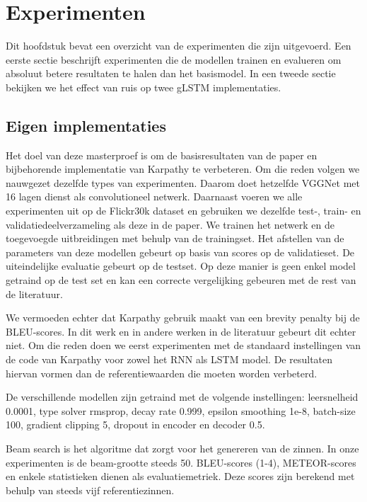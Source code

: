 \chapter{Experimenten} %
\label{cha:experimenten}
Dit hoofdstuk bevat een overzicht van de experimenten die zijn uitgevoerd. Een eerste sectie beschrijft experimenten die de modellen trainen en evalueren om absoluut betere resultaten te halen dan het basismodel. In een tweede sectie bekijken we het effect van ruis op twee gLSTM implementaties.

\section{Eigen implementaties} %
\label{sec:eigen_implementaties_exp}
Het doel van deze masterproef is om de basisresultaten van de paper en bijbehorende implementatie van Karpathy\cite{Karpathy2015} te verbeteren. Om die reden volgen we nauwgezet dezelfde types van experimenten. Daarom doet hetzelfde VGGNet met 16 lagen dienst als convolutioneel netwerk. Daarnaast voeren we alle experimenten uit op de Flickr30k dataset en gebruiken we dezelfde test-, train- en validatiedeelverzameling als deze in de paper. We trainen het netwerk en de toegevoegde uitbreidingen met behulp van de trainingset. Het afstellen van de parameters van deze modellen gebeurt op basis van scores op de validatieset. De uiteindelijke evaluatie gebeurt op de testset. Op deze manier is geen enkel model getraind op de test set en kan een correcte vergelijking gebeuren met de rest van de literatuur.

We vermoeden echter dat Karpathy gebruik maakt van een brevity penalty  bij de BLEU-scores. In dit werk en in andere werken in de literatuur gebeurt dit echter niet. Om die reden doen we eerst experimenten met de standaard instellingen van de code van Karpathy voor zowel het RNN als LSTM model. De resultaten hiervan vormen dan de referentiewaarden die moeten worden verbeterd. 

De verschillende modellen zijn getraind met de volgende instellingen: leersnelheid 0.0001, type solver rmsprop, decay rate 0.999, epsilon smoothing 1e-8, batch-size 100, gradient clipping 5, dropout in encoder en decoder 0.5. 

Beam search is het algoritme dat zorgt voor het genereren van de zinnen. In onze experimenten is de beam-grootte steeds 50.
BLEU-scores (1-4), METEOR-scores en enkele statistieken dienen als evaluatiemetriek. Deze scores zijn berekend met behulp van steeds vijf referentiezinnen.

